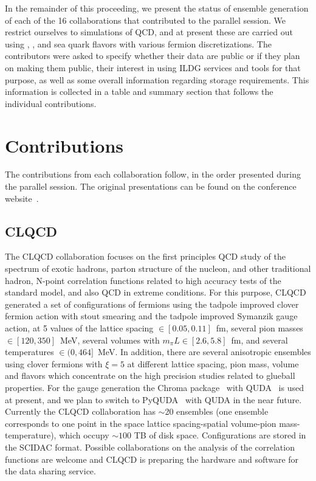 \documentclass[a4paper,11pt]{article}
\begin{document}
In the remainder of this proceeding, we present the status of ensemble
generation of each of the 16 collaborations that contributed to the
parallel session. We restrict ourselves to simulations of QCD, and at
present these are carried out using , , and
 sea quark flavors with various fermion
discretizations. The contributors were asked to specify whether their
data are public or if they plan on making them public, their interest
in using ILDG services and tools for that purpose, as well as some
overall information regarding storage requirements. This information
is collected in a table and summary section that follows the
individual contributions.

\section{Contributions}
The contributions from each collaboration follow, in the order
presented during the parallel session. The original presentations can
be found on the conference website~\cite{parallel-session}.

\newpage
\subsection{CLQCD}

The CLQCD collaboration focuses on the first principles QCD study of
the spectrum of exotic hadrons, parton structure of the nucleon, and
other traditional hadron, N-point correlation functions related to
high accuracy tests of the standard model, and also QCD in extreme
conditions. For this purpose, CLQCD generated a set of configurations
of  fermions using the tadpole improved clover fermion action
with stout smearing and the tadpole improved Symanzik gauge action, at
5 values of the lattice spacing $\in[0.05,0.11]$~fm, several pion
masses $\in[120, 350]$~MeV, several volumes with
$m_{\pi}L\in[2.6,5.8]$~fm, and several temperatures
$\in(0,464]$~MeV. In addition, there are several anisotropic ensembles
  using clover fermions with $\xi=5$ at different lattice spacing,
  pion mass, volume and flavors which concentrate on the high
  precision studies related to glueball properties. For the gauge
  generation the Chroma package~\cite{Edwards:2004sx} with
  QUDA~\cite{Clark:2009wm,Babich:2011np,Clark:2016rdz} is used at
  present, and we plan to switch to PyQUDA~\cite{Jiang:2024lto} with
  QUDA in the near future. Currently the CLQCD collaboration has
  $\sim$20 ensembles (one ensemble corresponds to one point in the
  space lattice spacing-spatial volume-pion mass-temperature), which
  occupy $\sim 100$ TB of disk space. Configurations are stored in the
  SCIDAC format. Possible collaborations on the analysis of the
  correlation functions are welcome and CLQCD is preparing the
  hardware and software for the data sharing service.
\end{document}
